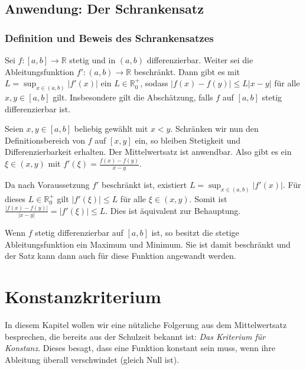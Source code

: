 \documentclass[fontsize=9pt,
               parskip=half-,
               DIV=14,
               listof=chapterentry,
               tocflat]{scrbook}
\begin{document}
\section{Anwendung: Der Schrankensatz}

\subsection{Definition und Beweis des Schrankensatzes}

\begin{theorem*}[Schrankensatz]
Sei $f:[a,b]\to \mathbb {R} $ stetig und in $(a,b)$ differenzierbar. Weiter sei die Ableitungsfunktion $f':(a,b)\to \mathbb {R} $ beschränkt. Dann gibt es mit $L=\sup _{x\in (a,b)}|f'(x)|$ ein $L\in \mathbb {R} _{0}^{+}$, sodass $|f(x)-f(y)|\leq L|x-y|$ für alle $x,y\in [a,b]$ gilt. Insbesondere gilt die Abschätzung, falls $f$ auf $[a,b]$ stetig differenzierbar ist.

\end{theorem*}

\begin{proof*}[Schrankensatz]
Seien $x,y\in [a,b]$ beliebig gewählt mit $x<y$. Schränken wir nun den Definitionsbereich von $f$ auf $[x,y]$ ein, so bleiben Stetigkeit und Differenzierbarkeit erhalten. Der Mittelwertsatz ist anwendbar. Also gibt es ein $\xi \in (x,y)$ mit $f'(\xi )={\tfrac {f(x)-f(y)}{x-y}}$.

Da nach Voraussetzung $f'$ beschränkt ist, existiert $L=\sup _{x\in (a,b)}|f'(x)|$. Für dieses $L\in \mathbb {R} _{0}^{+}$ gilt $|f'(\xi )|\leq L$ für alle $\xi \in (x,y)$. Somit ist ${\tfrac {|f(x)-f(y)|}{|x-y|}}=|f'(\xi )|\leq L$. Dies ist äquivalent zur Behauptung.

Wenn $f$ stetig differenzierbar auf $[a,b]$ ist, so besitzt die stetige Ableitungsfunktion ein Maximum und Minimum. Sie ist damit beschränkt und der Satz kann dann auch für diese Funktion angewandt werden.

\end{proof*}



\chapter{Konstanzkriterium}

In diesem Kapitel wollen wir eine nützliche Folgerung aus dem Mittelwertsatz besprechen, die bereits aus der Schulzeit bekannt ist: \emph{Das Kriterium für Konstanz}. Dieses besagt, dass eine Funktion konstant sein muss, wenn ihre Ableitung überall verschwindet (gleich Null ist).
\end{document}
